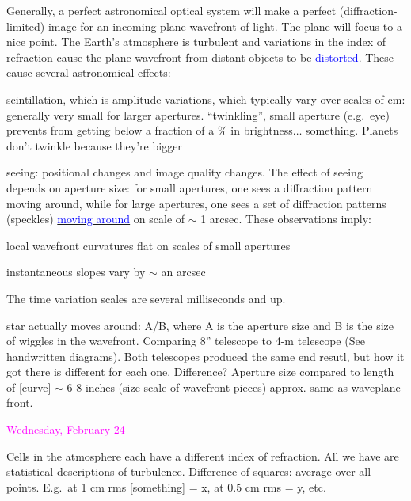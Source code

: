 \documentclass[12pt]{article}
\begin{document}
Generally, a perfect astronomical optical system will make a perfect
(diffraction-limited) image for an incoming plane wavefront of light.
The plane will focus to a nice point.
The Earth's atmosphere is turbulent and variations in the index of
refraction cause the plane wavefront from distant objects to be
\href{http://astronomy.nmsu.edu/holtz/a535/html/diagrams/a535/seeing.htm}
{\textcolor{blue}{distorted}}.
These cause several astronomical effects:
\begin{itemize*}
    \item scintillation, which is amplitude variations, which
        typically vary over scales of cm: generally very small for larger
        apertures. \textcolor{myBlue}{``twinkling'', small aperture
        (e.g.\ eye) prevents from getting below a fraction of a \% in
        brightness$\ldots$ something. Planets don't twinkle because they're
        bigger}
    \item seeing: positional changes and image quality
        changes. The effect of seeing depends on aperture size: for small
        apertures, one sees a diffraction pattern moving around, while for
        large apertures, one sees a set of diffraction patterns (speckles)
        \href{https://en.wikipedia.org/wiki/Speckle_imaging#/media/File:Eps_aql_movie_not_2000.gif}
        {\textcolor{blue}{moving around}}
        on scale of $\sim$ 1 arcsec. These observations
        imply:
        \begin{itemize*}
            \item local wavefront curvatures flat on scales of small apertures
            \item instantaneous slopes vary by $\sim$ an arcsec
        \end{itemize*}
\end{itemize*}
The time variation scales are
\textcolor{myGreen}{several milliseconds} and up.

\textcolor{myBlue}{star actually moves around: A/B, where A is the aperture
size and B is the size of wiggles in the wavefront. Comparing 8'' telescope
to 4-m telescope (See handwritten diagrams).
Both telescopes produced the same end resutl, but how it got there is different
for each one. Difference? Aperture size compared to length of [curve] $\sim$
6-8 inches (size scale of wavefront pieces) approx. same as waveplane front.}



\textcolor{magenta}{Wednesday, February 24}

\textcolor{myBlue}{Cells in the atmosphere each have a different
index of refraction. All we have are statistical descriptions of
turbulence. Difference of squares: average over all points.
E.g.\ at 1 cm rms [something] = x, at 0.5 cm rms = y, etc.}
\end{document}
